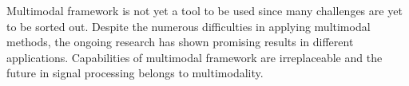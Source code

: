 \documentclass[a4paper]{article}
\begin{document}
Multimodal framework is not yet a tool to be used since many challenges are yet to be sorted out. Despite the numerous difficulties in applying multimodal methods, the ongoing research has shown promising results in different applications. Capabilities of multimodal framework are irreplaceable and the future in signal processing belongs to multimodality.  






\clearpage
\appendix


\newpage


\end{document}
